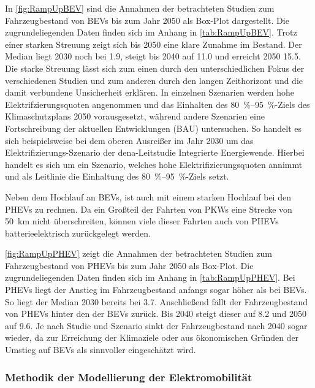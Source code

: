 In \autoref{fig:RampUpBEV} sind die Annahmen der betrachteten Studien zum Fahrzeugbestand von \glspl{BEV} bis zum Jahr \num{2050} als Box-Plot dargestellt.
Die zugrundeliegenden Daten finden sich im Anhang in \autoref{tab:RampUpBEV}.
Trotz einer starken Streuung zeigt sich bis \num{2050} eine klare Zunahme im Bestand.
Der Median liegt 2030 noch bei \SI{1.9}{\MioStk}, steigt bis \num{2040} auf \SI{11.0}{\MioStk} und erreicht \num{2050} \SI{15.5}{\MioStk}.
Die starke Streuung lässt sich zum einen durch den unterschiedlichen Fokus der verschiedenen Studien und zum anderen durch den langen Zeithorizont und die damit verbundene Unsicherheit erklären.
In einzelnen Szenarien werden hohe Elektrifzierungsquoten angenommen und das Einhalten des \SIrange[range-phrase=~{--}~]{80}{95}{\percent}-Ziels des Klimaschutzplans \num{2050} vorausgesetzt, während andere Szenarien eine Fortschreibung der aktuellen Entwicklungen (\gls{BAU}) untersuchen.
So handelt es sich beispielsweise bei dem oberen Ausreißer im Jahr 2030 um das Elektrifizierungs-Szenario der dena-Leitstudie \glqq Integrierte Energiewende\grqq \cite{DEAGH2018}.
Hierbei handelt es sich um ein Szenario, welches hohe Elektrifizierungsquoten annimmt und als Leitlinie die Einhaltung des  \SIrange[range-phrase=~{--}~]{80}{95}{\percent}-Ziels setzt.\medskip

Neben dem Hochlauf an \glspl{BEV}, ist auch mit einem starken Hochlauf bei den \glspl{PHEV} zu rechnen.
Da ein Großteil der Fahrten von \glspl{PKW} eine Strecke von \SI{50}{\km} nicht überschreiten, können viele dieser Fahrten auch von \glspl{PHEV} batterieelektrisch zurückgelegt werden. \cite{Agora2019}



\autoref{fig:RampUpPHEV} zeigt die Annahmen der betrachteten Studien zum Fahrzeugbestand von \glspl{PHEV} bis zum Jahr \num{2050} als Box-Plot.
Die zugrundeliegenden Daten finden sich im Anhang in \autoref{tab:RampUpPHEV}.
Bei \glspl{PHEV} liegt der Anstieg im Fahrzeugbestand anfangs sogar höher als bei \glspl{BEV}.
So liegt der Median 2030 bereits bei \SI{3.7}{\MioStk}.
Anschließend fällt der Fahrzeugbestand von \glspl{PHEV} hinter den der \glspl{BEV} zurück.
Bis \num{2040} steigt dieser auf \SI{8.2}{\MioStk} und \num{2050} auf \SI{9.6}{\MioStk}.
Je nach Studie und Szenario sinkt der Fahrzeugbestand nach \num{2040} sogar wieder, da zur Erreichung der Klimaziele oder aus ökonomischen Gründen der Umstieg auf \glspl{BEV} als sinnvoller eingeschätzt wird.


\subsubsection{Methodik der Modellierung der Elektromobilität}

